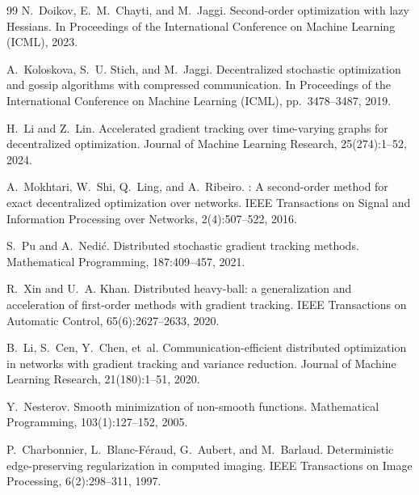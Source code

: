 \documentclass[review,onefignum,onetabnum]{siamart171218}
\begin{document}
\begin{thebibliography}{99}
		N.~Doikov, E.~M.~Chayti, and M.~Jaggi.
		\newblock Second-order optimization with lazy {H}essians.
		\newblock In Proceedings of the International Conference on Machine Learning (ICML), 2023.
		
		A.~Koloskova, S.~U. Stich, and M.~Jaggi.
		\newblock Decentralized stochastic optimization and gossip algorithms with compressed communication.
		\newblock In Proceedings of the International Conference on Machine Learning (ICML), pp.~3478--3487, 2019.
		
		H.~Li and Z.~Lin.
		\newblock Accelerated gradient tracking over time-varying graphs for decentralized optimization.
		\newblock Journal of Machine Learning Research, 25(274):1--52, 2024.
		
		A.~Mokhtari, W.~Shi, Q.~Ling, and A.~Ribeiro.
		: A second-order method for exact decentralized optimization over networks.
		\newblock IEEE Transactions on Signal and Information Processing over Networks, 2(4):507--522, 2016.
		
		S.~Pu and A.~Nedi{\'c}.
		\newblock Distributed stochastic gradient tracking methods.
		\newblock Mathematical Programming, 187:409--457, 2021.
		
		R.~Xin and U.~A. Khan.
		\newblock Distributed heavy-ball: a generalization and acceleration of first-order methods with gradient tracking.
		\newblock IEEE Transactions on Automatic Control, 65(6):2627--2633, 2020.
		
		B.~Li, S.~Cen, Y.~Chen, et~al.
		\newblock Communication-efficient distributed optimization in networks with gradient tracking and variance reduction.
		\newblock Journal of Machine Learning Research, 21(180):1--51, 2020.
		
		Y.~Nesterov.
		\newblock Smooth minimization of non-smooth functions.
		\newblock Mathematical Programming, 103(1):127--152, 2005.
		
		P.~Charbonnier, L.~Blanc-F{\'e}raud, G.~Aubert, and M.~Barlaud.
		\newblock Deterministic edge-preserving regularization in computed imaging.
		\newblock IEEE Transactions on Image Processing, 6(2):298--311, 1997.
		

\end{thebibliography}
\end{document}
